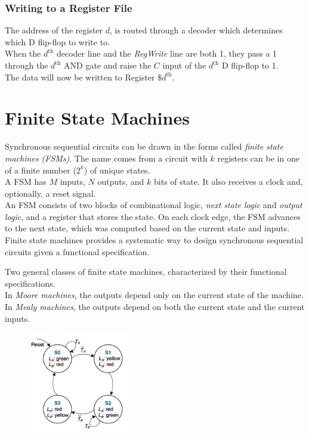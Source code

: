 \documentclass[12pt]{article}
\theoremstyle{definition}
\begin{document}
  \subsubsection{Writing to a Register File}
  The address of the register $d$, is routed through a decoder which determines which D flip-flop to write to. \\
  When the $d^{\text{th}}$ decoder line and the \emph{RegWrite} line are both 1, they pass a 1 through the $d^{\text{th}}$ AND gate and raise the $C$ input of the $d^{\text{th}}$ D flip-flop to 1. \\
  The data will now be written to Register $\$d^{\text{th}}$.

  \section{Finite State Machines}
  Synchronous sequential circuits can be drawn in the forms called \emph{finite state machines (FSMs)}.
  The name comes from a circuit with $k$ registers can be in one of a finite number ($2^{k}$) of unique states. \\
  A FSM has $M$ inputs, $N$ outputs, and $k$ bits of state.
  It also receives a clock and, optionally, a reset signal. \\
  An FSM consists of two blocks of combinational logic, \emph{next state logic} and \emph{output logic}, and a register that stores the state.
  On each clock edge, the FSM advances to the next state, which was computed based on the current state and inputs. \\
  Finite state machines provides a systematic way to design synchronous sequential circuits given a functional specification.

  Two general classes of finite state machines, characterized by their functional specifications. \\
  In \emph{Moore machines}, the outputs depend only on the current state of the machine. \\
  In \emph{Mealy machines}, the outputs depend on both the current state and the current inputs.

  \begin{figure}
    \includegraphics[width=0.4\textwidth]{pictures/stateTransistionDiagram.png}
  \end{figure}
\end{document}
